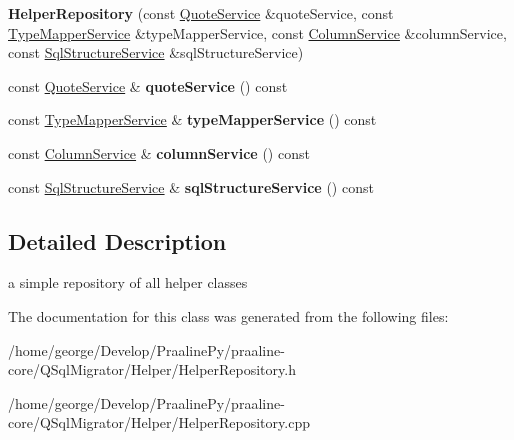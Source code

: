 \begin{DoxyCompactItemize}
\item 
\mbox{\label{class_q_sql_migrator_1_1_helper_1_1_helper_repository_a792d551f34b97a943b9dd0684dfa40cd}} 
{\bfseries Helper\+Repository} (const \hyperlink{class_q_sql_migrator_1_1_helper_1_1_quote_service}{Quote\+Service} \&quote\+Service, const \hyperlink{class_q_sql_migrator_1_1_helper_1_1_type_mapper_service}{Type\+Mapper\+Service} \&type\+Mapper\+Service, const \hyperlink{class_q_sql_migrator_1_1_helper_1_1_column_service}{Column\+Service} \&column\+Service, const \hyperlink{class_q_sql_migrator_1_1_helper_1_1_sql_structure_service}{Sql\+Structure\+Service} \&sql\+Structure\+Service)
\item 
\mbox{\label{class_q_sql_migrator_1_1_helper_1_1_helper_repository_a1c2e73191c625c5f7d2a0d9eebce9c89}} 
const \hyperlink{class_q_sql_migrator_1_1_helper_1_1_quote_service}{Quote\+Service} \& {\bfseries quote\+Service} () const
\item 
\mbox{\label{class_q_sql_migrator_1_1_helper_1_1_helper_repository_a149d37f18d261c626f29b7f406de304b}} 
const \hyperlink{class_q_sql_migrator_1_1_helper_1_1_type_mapper_service}{Type\+Mapper\+Service} \& {\bfseries type\+Mapper\+Service} () const
\item 
\mbox{\label{class_q_sql_migrator_1_1_helper_1_1_helper_repository_ad24723b30bad0169b63277363536897f}} 
const \hyperlink{class_q_sql_migrator_1_1_helper_1_1_column_service}{Column\+Service} \& {\bfseries column\+Service} () const
\item 
\mbox{\label{class_q_sql_migrator_1_1_helper_1_1_helper_repository_a8a2b7b477bce1d022e433f1af95a8660}} 
const \hyperlink{class_q_sql_migrator_1_1_helper_1_1_sql_structure_service}{Sql\+Structure\+Service} \& {\bfseries sql\+Structure\+Service} () const
\end{DoxyCompactItemize}


\subsection{Detailed Description}
a simple repository of all helper classes 

The documentation for this class was generated from the following files\+:\begin{DoxyCompactItemize}
\item 
/home/george/\+Develop/\+Praaline\+Py/praaline-\/core/\+Q\+Sql\+Migrator/\+Helper/Helper\+Repository.\+h\item 
/home/george/\+Develop/\+Praaline\+Py/praaline-\/core/\+Q\+Sql\+Migrator/\+Helper/Helper\+Repository.\+cpp\end{DoxyCompactItemize}
